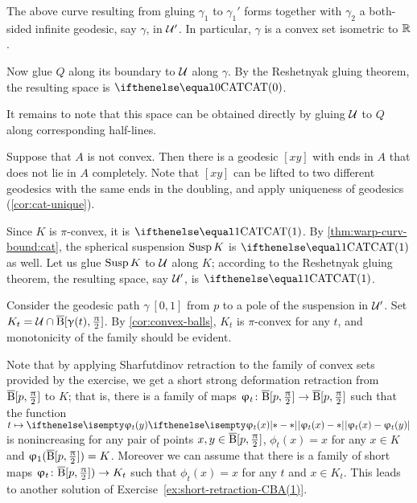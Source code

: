 The above curve resulting from gluing  
$\gamma_1$ to $\gamma_1'$ 
forms together with $ \gamma_2$ 
a both-sided infinite geodesic, say $\gamma$, in $\mathcal{U}'$.
In particular, $\gamma$ is a convex set isometric to $\mathbb{R}$.

Now glue 
$Q$ along its boundary to $\mathcal{U}$ along $\gamma$.
By the Reshetnyak gluing theorem, the resulting space is $\CAT0$.

It remains to note that this space can be obtained directly by gluing $\mathcal{U}$ to $Q$ along 
corresponding half-lines.

Suppose that $A$ is not convex.
Then there is a geodesic $[xy]$ with ends in $A$ that does not lie in $A$ completely.
Note that $[xy]$ can be lifted to two different geodesics with the same ends  in the doubling, and apply uniqueness of geodesics (\ref{cor:cat-unique}).

Since $K$ is $\pi$-convex, it is $\CAT1$.
By \ref{thm:warp-curv-bound:cat}, the spherical suspension $\mathop{\rm Susp}\nolimits K$ is $\CAT1$ as well.
Let us glue $\mathop{\rm Susp}\nolimits K$ to $\mathcal{U}$  along $K$;
according to the Reshetnyak gluing theorem, the resulting space, say $\mathcal{U}'$, is $\CAT1$.

Consider the geodesic path $\gamma\:[0,1]$ from $p$ to a pole of the suspension in $\mathcal{U}'$.
Set $K_t=\spc{U}\cap\cBall[\gamma(t),\tfrac\pi2]$.
By \ref{cor:convex-balls}, $K_t$ is $\pi$-convex for any $t$,  and monotonicity of the family should be evident.

Note that by applying Sharfutdinov retraction to the family of convex sets provided by the exercise,
we get a short strong deformation retraction from $\overline{\mathrm{B}}{}[p,\tfrac{\uppi}2]$ to $K$;
that is, there is a family of maps $\phi_t\:\cBall[p,\tfrac\pi2]\to \cBall[p,\tfrac\pi2]$ such that 
the function $t\mapsto \dist{\phi_t(x)}{\phi_t(y)}{}$ is nonincreasing for any pair of points $x,y\in\cBall[p,\tfrac\pi2]$, $\phi_t(x)=x$ for any $x\in K$ and $\upvarphi_1(\overline{\mathrm{B}}{}[p,\tfrac{\uppi}2])=K$. 
Moreover we can assume that there is a family of short maps 
$\phi_t\:\cBall[p,\tfrac\pi2])\to  K_t$ such that $\phi_t(x)=x$ for any $t$ and $x\in K_t$.
This leads to another solution of Exercise~\ref{ex:short-retraction-CBA(1)}.




